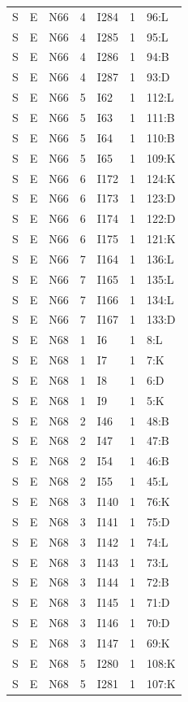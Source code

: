 {\begin{longtable}{lllrlrp{.35\linewidth}}
S & E & N66 & 4 & I284 & 1 & 96:L \\
S & E & N66 & 4 & I285 & 1 & 95:L \\
S & E & N66 & 4 & I286 & 1 & 94:B \\
S & E & N66 & 4 & I287 & 1 & 93:D \\
S & E & N66 & 5 & I62 & 1 & 112:L \\
S & E & N66 & 5 & I63 & 1 & 111:B \\
S & E & N66 & 5 & I64 & 1 & 110:B \\
S & E & N66 & 5 & I65 & 1 & 109:K \\
S & E & N66 & 6 & I172 & 1 & 124:K \\
S & E & N66 & 6 & I173 & 1 & 123:D \\
S & E & N66 & 6 & I174 & 1 & 122:D \\
S & E & N66 & 6 & I175 & 1 & 121:K \\
S & E & N66 & 7 & I164 & 1 & 136:L \\
S & E & N66 & 7 & I165 & 1 & 135:L \\
S & E & N66 & 7 & I166 & 1 & 134:L \\
S & E & N66 & 7 & I167 & 1 & 133:D \\
S & E & N68 & 1 & I6 & 1 & 8:L \\
S & E & N68 & 1 & I7 & 1 & 7:K \\
S & E & N68 & 1 & I8 & 1 & 6:D \\
S & E & N68 & 1 & I9 & 1 & 5:K \\
S & E & N68 & 2 & I46 & 1 & 48:B \\
S & E & N68 & 2 & I47 & 1 & 47:B \\
S & E & N68 & 2 & I54 & 1 & 46:B \\
S & E & N68 & 2 & I55 & 1 & 45:L \\
S & E & N68 & 3 & I140 & 1 & 76:K \\
S & E & N68 & 3 & I141 & 1 & 75:D \\
S & E & N68 & 3 & I142 & 1 & 74:L \\
S & E & N68 & 3 & I143 & 1 & 73:L \\
S & E & N68 & 3 & I144 & 1 & 72:B \\
S & E & N68 & 3 & I145 & 1 & 71:D \\
S & E & N68 & 3 & I146 & 1 & 70:D \\
S & E & N68 & 3 & I147 & 1 & 69:K \\
S & E & N68 & 5 & I280 & 1 & 108:K \\
S & E & N68 & 5 & I281 & 1 & 107:K \\

\end{longtable}}
